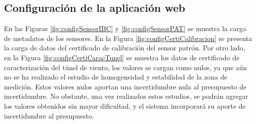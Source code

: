 \subsection{Configuración de la aplicación web}

En las Figuras \ref{fig:configSensorIBC} y \ref{fig:configSensorPAT} se muestra la carga de metadatos de los sensores. En la Figura \ref{fig:configCertiCalibracion} se presenta la carga de datos del certificado de calibración del sensor patrón. Por otro lado, en la Figura \ref{fig:configCertiCaracTunel} se muestra los datos de certificado de caracterización del túnel de viento, los valores se cargan como nulos, ya que aún no se ha realizado el estudio de homogeneidad y estabilidad de la zona de medición. Estos valores nulos aportan una incertidumbre nula al presupuesto de incertidumbre. No obstante, una vez realizados estos estudios, se podrán agregar los valores obtenidos sin mayor dificultad, y el sistema incorporará su aporte de incertidumbre al presupuesto.


